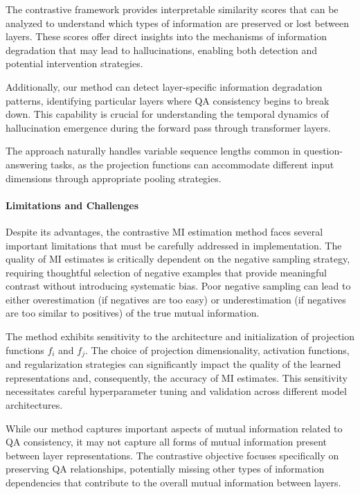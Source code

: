 The contrastive framework provides interpretable similarity scores that can be analyzed to understand which types of information are preserved or lost between layers. These scores offer direct insights into the mechanisms of information degradation that may lead to hallucinations, enabling both detection and potential intervention strategies.

Additionally, our method can detect layer-specific information degradation patterns, identifying particular layers where QA consistency begins to break down. This capability is crucial for understanding the temporal dynamics of hallucination emergence during the forward pass through transformer layers.

The approach naturally handles variable sequence lengths common in question-answering tasks, as the projection functions can accommodate different input dimensions through appropriate pooling strategies.

\paragraph{Limitations and Challenges}

Despite its advantages, the contrastive MI estimation method faces several important limitations that must be carefully addressed in implementation. The quality of MI estimates is critically dependent on the negative sampling strategy, requiring thoughtful selection of negative examples that provide meaningful contrast without introducing systematic bias. Poor negative sampling can lead to either overestimation (if negatives are too easy) or underestimation (if negatives are too similar to positives) of the true mutual information.

The method exhibits sensitivity to the architecture and initialization of projection functions $f_i$ and $f_j$. The choice of projection dimensionality, activation functions, and regularization strategies can significantly impact the quality of the learned representations and, consequently, the accuracy of MI estimates. This sensitivity necessitates careful hyperparameter tuning and validation across different model architectures.

While our method captures important aspects of mutual information related to QA consistency, it may not capture all forms of mutual information present between layer representations. The contrastive objective focuses specifically on preserving QA relationships, potentially missing other types of information dependencies that contribute to the overall mutual information between layers.

